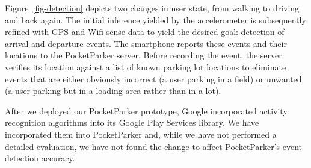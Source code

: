 Figure~\ref{fig-detection} depicts two changes in user state, from walking to
driving and back again.  The initial inference yielded by the accelerometer
is subsequently refined with GPS and Wifi sense data to yield the desired
goal: detection of arrival and departure events.  The smartphone reports
these events and their locations to the PocketParker server. Before recording
the event, the server verifies its location against a list of known parking
lot locations to eliminate events that are either obviously incorrect (a user
parking in a field) or unwanted (a user parking but in a loading area rather
than in a lot).

After we deployed our PocketParker prototype, Google incorporated activity
recognition algorithms into its Google Play Services library. We have
incorporated them into PocketParker and, while we have not performed a
detailed evaluation, we have not found the change to affect PocketParker's
event detection accuracy.
